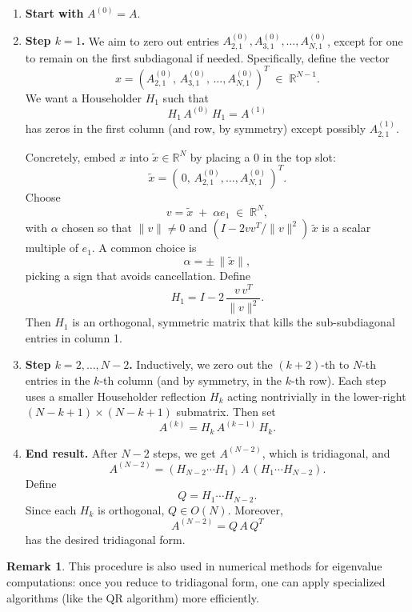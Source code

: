 \documentclass[letterpaper,11pt,oneside,reqno]{article}
\numberwithin{equation}{section}
\theoremstyle{definition}
\newtheorem{remark}[proposition]{Remark}
\begin{document}
\begin{enumerate}[1.]
\item \textbf{Start with } \(A^{(0)}=A\).
\item \textbf{Step \(k=1\).}
   We aim to zero out entries \(A^{(0)}_{2,1},A^{(0)}_{3,1},\ldots,A^{(0)}_{N,1}\), except for one to remain on the first subdiagonal if needed. Specifically, define the vector
   \[
     x
     = (A^{(0)}_{2,1},\,A^{(0)}_{3,1},\,\dots,A^{(0)}_{N,1})^T
     \;\in\;\mathbb{R}^{N-1}.
   \]
   We want a Householder \(H_1\) such that
   \[
     H_1\,A^{(0)}\,H_1
     = A^{(1)}
   \]
   has zeros in the first column (and row, by symmetry) except possibly \(A^{(1)}_{2,1}\).

   Concretely, embed \(x\) into \(\tilde x \in \mathbb{R}^N\) by placing a \(0\) in the top slot:
   \[
     \tilde x = (\,0,\, A^{(0)}_{2,1},\ldots,A^{(0)}_{N,1}\,)^T.
   \]
   Choose
   \[
     v = \tilde x \;+\;\alpha e_1
     \;\in\;\mathbb{R}^N,
   \]
   with \(\alpha\) chosen so that
   \(\|v\|\neq 0\) and \((I - 2vv^T/\|v\|^2)\,\tilde x\) is a scalar multiple of \(e_1\).  A common choice is
   \[
     \alpha = \pm\,\|\tilde x\|,
   \]
   picking a sign that avoids cancellation.  Define
   \[
     H_1 = I - 2 \,\frac{v\,v^T}{\|v\|^2}.
   \]
   Then \(H_1\) is an orthogonal, symmetric matrix that kills the sub-subdiagonal entries in column 1.
\item \textbf{Step \(k=2,\dots,N-2\).}
   Inductively, we zero out the \((k+2)\)-th to \(N\)-th entries in the \(k\)-th column (and by symmetry, in the \(k\)-th row).  Each step uses a smaller Householder reflection \(H_k\) acting nontrivially in the lower-right \((N-k+1)\times(N-k+1)\) submatrix.  Then set
   \[
     A^{(k)} = H_k\,A^{(k-1)}\,H_k.
   \]
\item \textbf{End result.}
   After \(N-2\) steps, we get \(A^{(N-2)}\), which is tridiagonal, and
   \[
     A^{(N-2)}
     = (H_{N-2}\cdots H_1)\,A\,(H_1\cdots H_{N-2}).
   \]
   Define
   \[
     Q = H_1 \cdots H_{N-2}.
   \]
   Since each \(H_k\) is orthogonal, \(Q\in O(N)\). Moreover,
   \[
     A^{(N-2)} = Q\,A\,Q^T
   \]
   has the desired tridiagonal form.
\end{enumerate}

\begin{remark}
This procedure is also used in numerical methods for eigenvalue computations: once you reduce to tridiagonal form, one can apply specialized algorithms (like the QR algorithm) more efficiently.
\end{remark}
\end{document}
